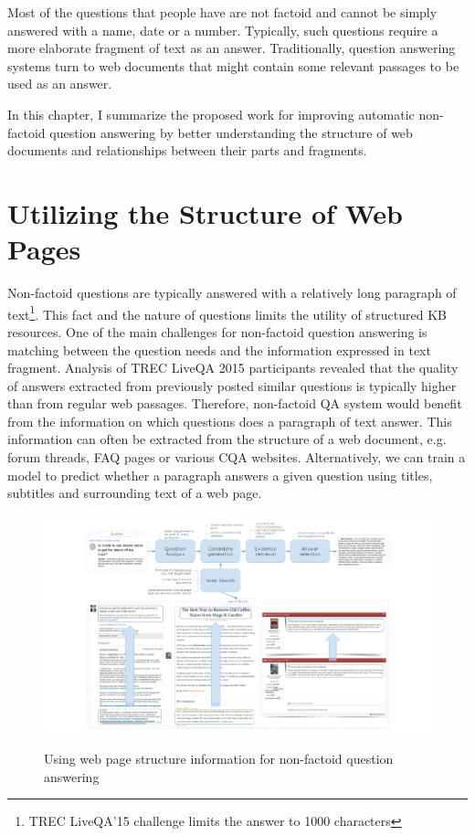 %


Most of the questions that people have are not factoid and cannot be simply answered with a name, date or a number.
Typically, such questions require a more elaborate fragment of text as an answer.
Traditionally, question answering systems turn to web documents that might contain some relevant passages to be used as an answer.

\noindent
In this chapter, I summarize the proposed work for improving automatic non-factoid question answering by better understanding the structure of web documents and relationships between their parts and fragments.

\section{Utilizing the Structure of Web Pages}

Non-factoid questions are typically answered with a relatively long paragraph of text\footnote{TREC LiveQA'15 challenge limits the answer to 1000 characters}.
This fact and the nature of questions limits the utility of structured KB resources.
One of the main challenges for non-factoid question answering is matching between the question needs and the information expressed in text fragment.
Analysis of TREC LiveQA 2015 participants \cite{savenkov_liveqa15} revealed that the quality of answers extracted from previously posted similar questions is typically higher than from regular web passages.
Therefore, non-factoid QA system would benefit from the information on which questions does a paragraph of text answer.
This information can often be extracted from the structure of a web document, e.g. forum threads, FAQ pages or various CQA websites.
Alternatively, we can train a model to predict whether a paragraph answers a given question using titles, subtitles and surrounding text of a web page.

\begin{figure}[h]
\centering
\includegraphics[width=\textwidth]{img/web_page_structure_nonfactoid}
\label{fig:web_page_structure_nonfactoid}
\caption{Using web page structure information for non-factoid question answering}
\end{figure}

